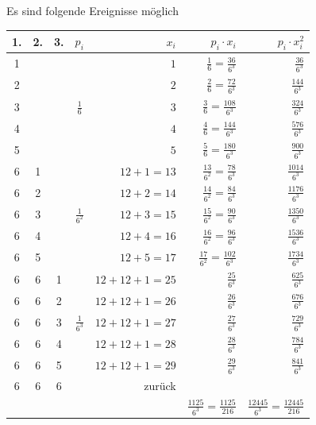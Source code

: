 \begin{loesung}
Es sind folgende Ereignisse möglich
\begin{center}
\renewcommand{\arraystretch}{1.2}
\begin{tabular}{|ccc|c|r|r|r|}
\hline
1.&2.&3.&$p_i$&$x_i$&$p_i\cdot x_i$&$p_i\cdot x_i^2$\\
\hline
1& & &              &$         1$&$   \frac{1}{6}=\frac{ 36}{6^3}$&$\frac{   36}{6^3}$\\
2& & &              &$         2$&$   \frac{2}{6}=\frac{ 72}{6^3}$&$\frac{  144}{6^3}$\\
3& & &$    \frac16 $&$         3$&$   \frac{3}{6}=\frac{108}{6^3}$&$\frac{  324}{6^3}$\\
4& & &              &$         4$&$   \frac{4}{6}=\frac{144}{6^3}$&$\frac{  576}{6^3}$\\
5& & &              &$         5$&$   \frac{5}{6}=\frac{180}{6^3}$&$\frac{  900}{6^3}$\\[1pt]
\hline
6&1& &              &$   12+1=13$&$\frac{13}{6^2}=\frac{ 78}{6^3}$&$\frac{ 1014}{6^3}$\\
6&2& &              &$   12+2=14$&$\frac{14}{6^2}=\frac{ 84}{6^3}$&$\frac{ 1176}{6^3}$\\
6&3& &$\frac1{6^2} $&$   12+3=15$&$\frac{15}{6^2}=\frac{ 90}{6^3}$&$\frac{ 1350}{6^3}$\\
6&4& &              &$   12+4=16$&$\frac{16}{6^2}=\frac{ 96}{6^3}$&$\frac{ 1536}{6^3}$\\
6&5& &              &$   12+5=17$&$\frac{17}{6^2}=\frac{102}{6^3}$&$\frac{ 1734}{6^3}$\\[1pt]
\hline
6&6&1&              &$12+12+1=25$&$               \frac{ 25}{6^3}$&$\frac{  625}{6^3}$\\
6&6&2&              &$12+12+1=26$&$               \frac{ 26}{6^3}$&$\frac{  676}{6^3}$\\
6&6&3&$\frac1{6^3} $&$12+12+1=27$&$               \frac{ 27}{6^3}$&$\frac{  729}{6^3}$\\
6&6&4&              &$12+12+1=28$&$               \frac{ 28}{6^3}$&$\frac{  784}{6^3}$\\
6&6&5&              &$12+12+1=29$&$               \frac{ 29}{6^3}$&$\frac{  841}{6^3}$\\
6&6&6&              &zurück     &                                &                   \\
\hline
 & & &              &            &$\frac{1125}{6^3}=\frac{1125}{216}$
                                                                  &$\frac{12445}{6^3}=\frac{12445}{216}$\\[1pt]

\end{tabular}
\end{center}
\end{loesung}
